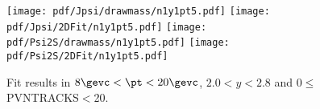 \begin{figure}[H]
\begin{center}
\texttt{[image: pdf/Jpsi/drawmass/n1y1pt5.pdf]}
\texttt{[image: pdf/Jpsi/2DFit/n1y1pt5.pdf]}
\vspace*{-0.5cm}
\texttt{[image: pdf/Psi2S/drawmass/n1y1pt5.pdf]}
\texttt{[image: pdf/Psi2S/2DFit/n1y1pt5.pdf]}
\vspace*{-0.5cm}
\end{center}
\caption{Fit results in $8\gevc<\pt<20\gevc$, $2.0<y<2.8$ and 0$\leq$PVNTRACKS$<$20.}
\label{Fitn1y1pt5}
\end{figure}
